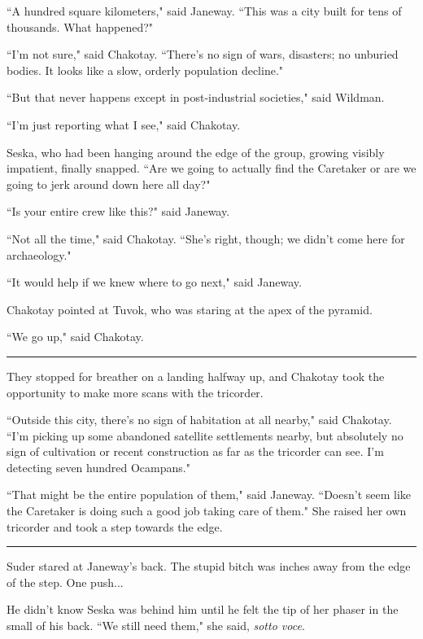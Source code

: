 \documentclass[twoside,letterpaper,12pt]{memoir}
\begin{document}
``A hundred square kilometers," said Janeway. ``This was a city built for tens of thousands. What happened?" 

``I'm not sure," said Chakotay. ``There's no sign of wars, disasters; no unburied bodies. It looks like a slow, orderly population decline." 

``But that never happens except in post-industrial societies," said Wildman. 

``I'm just reporting what I see," said Chakotay. 

Seska, who had been hanging around the edge of the group, growing visibly impatient, finally snapped. ``Are we going to actually find the Caretaker or are we going to jerk around down here all day?" 

``Is your entire crew like this?" said Janeway. 

``Not all the time," said Chakotay. ``She's right, though; we didn't come here for archaeology." 

``It would help if we knew where to go next," said Janeway. 

Chakotay pointed at Tuvok, who was staring at the apex of the pyramid. 

``We go up," said Chakotay. 

\begin{center}\rule{3cm}{0.4 pt}\end{center} 

They stopped for breather on a landing halfway up, and Chakotay took the opportunity to make more scans with the tricorder. 

``Outside this city, there's no sign of habitation at all nearby," said Chakotay. ``I'm picking up some abandoned satellite settlements nearby, but absolutely no sign of cultivation or recent construction as far as the tricorder can see. I'm detecting seven hundred Ocampans." 

``That might be the entire population of them," said Janeway. ``Doesn't seem like the Caretaker is doing such a good job taking care of them." She raised her own tricorder and took a step towards the edge. 

\begin{center}\rule{3cm}{0.4 pt}\end{center} 

Suder stared at Janeway's back. The stupid bitch was inches away from the edge of the step. One push... 

He didn't know Seska was behind him until he felt the tip of her phaser in the small of his back. ``We still need them," she said, \textit{sotto voce}. 
\end{document}
